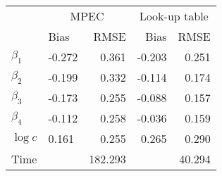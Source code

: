 
\begin{tabular}[t]{llrrr}
\toprule
\multicolumn{1}{c}{ } & \multicolumn{2}{c}{MPEC} & \multicolumn{2}{c}{Look-up table} \\
\cmidrule(l{3pt}r{3pt}){2-3} \cmidrule(l{3pt}r{3pt}){4-5}
  & Bias & RMSE & Bias & RMSE\\
\midrule
$\beta_{1}$ & -0.272 & 0.361 & -0.203 & 0.251\\
$\beta_{2}$ & -0.199 & 0.332 & -0.114 & 0.174\\
$\beta_{3}$ & -0.173 & 0.255 & -0.088 & 0.157\\
$\beta_{4}$ & -0.112 & 0.258 & -0.036 & 0.159\\
$\log c$ & 0.161 & 0.255 & 0.265 & 0.290\\
Time &  & 182.293 &  & 40.294\\
\bottomrule
\end{tabular}
